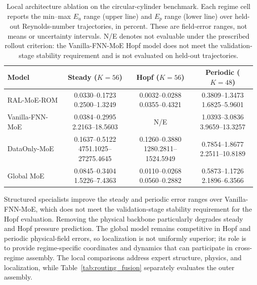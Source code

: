 \begin{table}[!ht]
\centering
\caption{Local architecture ablation on the circular-cylinder benchmark.
Each regime cell reports the min--max $E_u$ range (upper line) and $E_p$
range (lower line) over held-out Reynolds-number trajectories, in percent.
These are field-error ranges, not means or uncertainty intervals.
N/E denotes not evaluable under the prescribed rollout criterion: the
Vanilla-FNN-MoE Hopf model does not meet the validation-stage stability
requirement and is not evaluated on held-out trajectories.}
\label{tab:compact_ablation}
\small
\setlength{\tabcolsep}{4pt}
\begin{tabular}{@{}lccc@{}}
\toprule
Model & Steady ($K=56$) & Hopf ($K=56$) & Periodic ($K=48$) \\
\midrule
RAL-MoE-ROM
& \shortstack{0.0330--0.1723\\0.2500--1.3249}
& \shortstack{0.0032--0.0288\\0.0355--0.4321}
& \shortstack{0.3809--1.3473\\1.6825--5.9601} \\
\addlinespace
Vanilla-FNN-MoE
& \shortstack{0.0384--0.2995\\2.2163--18.5603}
& N/E
& \shortstack{1.0393--3.0836\\3.9659--13.3257} \\
\addlinespace
DataOnly-MoE
& \shortstack{0.1637--0.5122\\4751.1025--27275.4645}
& \shortstack{0.1260--0.3880\\1280.2811--1524.5949}
& \shortstack{0.7854--1.8677\\2.2511--10.8189} \\
\addlinespace
Global MoE
& \shortstack{0.0845--0.3404\\1.5226--7.4363}
& \shortstack{0.0110--0.0268\\0.0560--0.2882}
& \shortstack{0.5873--1.1726\\2.1896--6.3566} \\
\bottomrule
\end{tabular}
\end{table}

\FloatBarrier
Structured specialists improve the steady and periodic error ranges over
Vanilla-FNN-MoE, which does not meet the validation-stage stability requirement
for the Hopf evaluation. Removing the physical backbone
particularly degrades steady and Hopf pressure prediction. The global model
remains competitive in Hopf and periodic physical-field errors, so
localization is not uniformly superior; its role is to provide regime-specific
coordinates and dynamics that can participate in cross-regime assembly.
The local comparisons address expert structure, physics, and localization,
while Table~\ref{tab:routing_fusion} separately evaluates the outer assembly.

